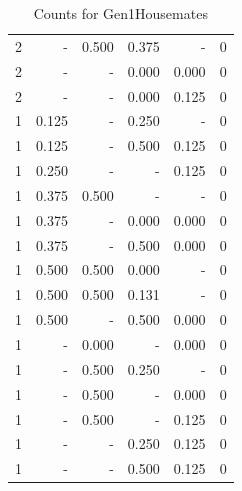 \documentclass[a4paper]{article}\usepackage{graphicx, color}
\begin{document}
\begin{table}[ht]
\begin{tabular}{rrrrrr}
  2 & - & 0.500 & 0.375 & - & 0 \\ 
   \rowcolor{sosoColor} 2 & - & - & 0.000 & 0.000 & 0 \\ 
   \rowcolor{sosoColor} 2 & - & - & 0.000 & 0.125 & 0 \\ 
   \rowcolor{sosoColor} 1 & 0.125 & - & 0.250 & - & 0 \\ 
   \rowcolor{sosoColor} 1 & 0.125 & - & 0.500 & 0.125 & 0 \\ 
   \rowcolor{nullColor} 1 & 0.250 & - & - & 0.125 & 0 \\ 
  1 & 0.375 & 0.500 & - & - & 0 \\ 
   \rowcolor{sosoColor} 1 & 0.375 & - & 0.000 & 0.000 & 0 \\ 
   \rowcolor{sosoColor} 1 & 0.375 & - & 0.500 & 0.000 & 0 \\ 
   \rowcolor{badColor} 1 & 0.500 & 0.500 & 0.000 & - & 0 \\ 
   \rowcolor{badColor} 1 & 0.500 & 0.500 & 0.131 & - & 0 \\ 
   \rowcolor{sosoColor} 1 & 0.500 & - & 0.500 & 0.000 & 0 \\ 
  1 & - & 0.000 & - & 0.000 & 0 \\ 
   \rowcolor{badColor} 1 & - & 0.500 & 0.250 & - & 0 \\ 
  1 & - & 0.500 & - & 0.000 & 0 \\ 
  1 & - & 0.500 & - & 0.125 & 0 \\ 
   \rowcolor{sosoColor} 1 & - & - & 0.250 & 0.125 & 0 \\ 
   \rowcolor{sosoColor} 1 & - & - & 0.500 & 0.125 & 0 \\ 
   \hline
\end{tabular}
\caption{Counts for Gen1Housemates} 
\end{table}
\end{document}
